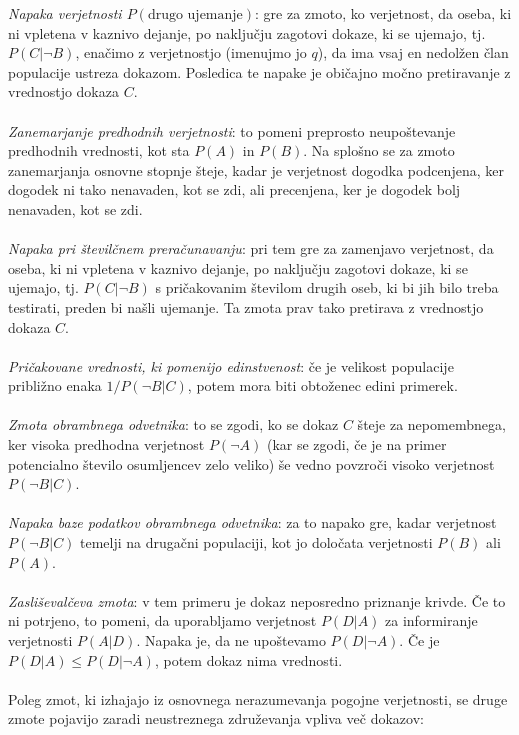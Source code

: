 \documentclass[fin1, tisk]{fmfdelo}
\theoremstyle{definition}
\theoremstyle{trditev}
\theoremstyle{izrek}
\begin{document}
\textit{Napaka verjetnosti $P(\text{drugo ujemanje})$}: gre za zmoto, ko verjetnost, da oseba, ki ni vpletena v kaznivo dejanje, po 
naključju zagotovi dokaze, ki se ujemajo, tj. $P(C \lvert \neg B)$, enačimo z verjetnostjo
(imenujmo jo $q$), da ima vsaj en nedolžen član populacije ustreza dokazom. Posledica te napake je običajno močno pretiravanje z vrednostjo
dokaza $C$.\\\\
\textit{Zanemarjanje predhodnih verjetnosti}: to pomeni preprosto neupoštevanje predhodnih vrednosti, kot sta $P(A)$ in $P(B)$. Na splošno
se za zmoto zanemarjanja osnovne stopnje šteje, kadar je verjetnost dogodka podcenjena, ker dogodek ni tako nenavaden, kot se zdi,
ali precenjena, ker je dogodek bolj nenavaden, kot se zdi.\\\\
\textit{Napaka pri številčnem preračunavanju}: pri tem gre za zamenjavo verjetnost, da oseba, ki ni vpletena v kaznivo dejanje, po naključju 
zagotovi dokaze, ki se ujemajo, tj. $P(C \lvert \neg B)$ s pričakovanim številom drugih oseb,
ki bi jih bilo treba testirati, preden bi našli ujemanje. Ta zmota prav tako pretirava z vrednostjo dokaza $C$.\\\\
\textit{Pričakovane vrednosti, ki pomenijo edinstvenost}: če je velikost populacije približno enaka $1/P(\neg B \lvert C)$, potem mora biti
obtoženec edini primerek. \\\\
\textit{Zmota obrambnega odvetnika}: to se zgodi, ko se dokaz $C$ šteje za nepomembnega, ker visoka predhodna verjetnost $P(\neg A)$ (kar
se zgodi, če je na primer potencialno število osumljencev zelo veliko) še vedno povzroči visoko verjetnost $P(\neg B \lvert C)$. \\\\
\textit{Napaka baze podatkov obrambnega odvetnika}: za to napako gre, kadar verjetnost $P(\neg B \lvert C)$ temelji na drugačni populaciji,
kot jo določata verjetnosti $P(B)$ ali $P(A)$.\\\\
\textit{Zasliševalčeva zmota}: v tem primeru je dokaz neposredno priznanje krivde. Če to ni potrjeno, to pomeni, da uporabljamo verjetnost $P(D \lvert A)$ za
informiranje verjetnosti $P(A \lvert D)$. Napaka je, da ne upoštevamo $P(D \lvert \neg A)$. Če je $P(D \lvert A) \leq P(D \lvert \neg A)$, potem dokaz
nima vrednosti.\\\\
Poleg zmot, ki izhajajo iz osnovnega nerazumevanja pogojne verjetnosti, se druge zmote pojavijo zaradi neustreznega združevanja vpliva več dokazov:\\
\end{document}
